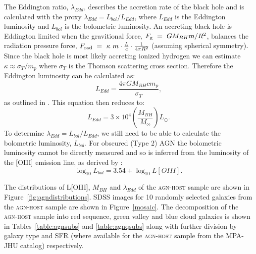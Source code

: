 The Eddington ratio, $\lambda_{Edd}$, describes the accretion rate of the black hole and is calculated with the proxy $\lambda_{Edd} = L_{bol}/L_{Edd}$, where $L_{Edd}$ is the Eddington luminosity and $L_{bol}$ is the bolometric luminosity. An accreting black hole is Eddington limited when the gravitional force, $F_{\rm{g}}~=~GM_{BH}m/R^2$, balances the radiation pressure force, $F_{\rm{rad}}~=~\kappa~m\cdot\frac{L}{c}\cdot\frac{1}{4\pi R^2}$ (assuming spherical symmetry). Since the black hole is most likely accreting ionized hydrogen we can estimate $\kappa\approx \sigma_T/m_p$ where $\sigma_T$ is the Thomson scattering cross section. Therefore the Eddington luminosity can be calculated as:
\begin{equation}
L_{Edd} = \frac{4\pi G M_{BH} c m_p}{\sigma_T},
\end{equation}
as outlined in \citet{binneymerrifield}. This equation then reduces to:
\begin{equation}
L_{Edd} = 3\times10^4 \left(\frac{M_{BH}}{M_{\odot}}\right) L_{\odot}.
\end{equation}
To determine $\lambda_{Edd} = L_{bol}/L_{Edd}$, we still need to be able to calculate the bolometric luminosity, $L_{bol}$. For obscured (Type 2) AGN the bolometric luminosity cannot be directly measured and so is inferred from the luminosity of the [OIII] emission line, as derived by \citet{heckman04}:
\begin{equation}
\log_{10}L_{bol} = 3.54 + \log_{10}L[OIII]. 
\end{equation}

The distributions of L[OIII], $M_{BH}$ and $\lambda_{Edd}$ of the \textsc{agn-host} sample are shown in Figure~\ref{fig:agndistributions}. SDSS images for 10 randomly selected galaxies from the \textsc{agn-host} sample are shown in Figure~\ref{mosaic}. The decomposition of the \textsc{agn-host} sample into red sequence, green valley and blue cloud galaxies is shown in Tables~\ref{table:agnsubs} and \ref{table:agnqsubs} along with further division by galaxy type and SFR (where available for the \textsc{agn-host} sample from the MPA-JHU catalog) respectively. 


